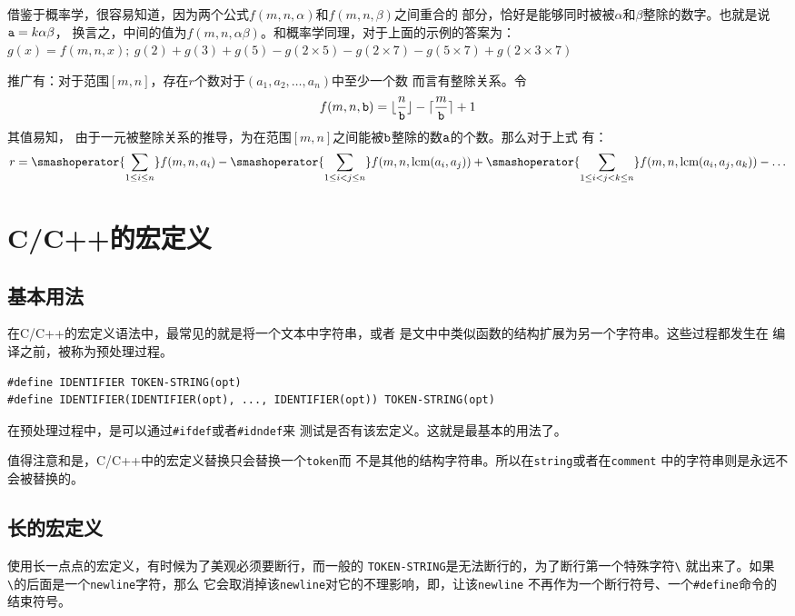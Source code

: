 借鉴于概率学，很容易知道，因为两个公式$f(m,n,\alpha)$和$f(m,n,\beta)$之间重合的
部分，恰好是能够同时被被$\alpha$和$\beta$整除的数字。也就是说$\text{\tt a}=k\alpha\beta$，
换言之，中间的值为$f(m,n,\alpha\beta)$。和概率学同理，对于上面的示例的答案为：%
$g(x)=f(m,n,x);\ g(2)+g(3)+g(5)-g(2\times5)-g(2\times7)-g(5\times7)+g(2\times3\times7)$

推广有：对于范围$[m,n]$，存在$r$个数对于$(a_1, a_2, \ldots, a_n)$中至少一个数
而言有整除关系。令$$f(m, n, \text{\tt b})=\lfloor{n\over\text{\tt b}}\rfloor-\lceil{m\over\text{\tt b}}\rceil + 1$$其值易知，
由于一元被整除关系的推导，为在范围$[m, n]$之间能被$\text{\tt b}$整除的数$\text{\tt a}$的个数。那么对于上式
有：$$r=\smashoperator{\sum_{1\le i\le n}}f(m,n,a_i)-
        \smashoperator{\sum_{1\le i<j\le n}}f(m,n,\lcm(a_i, a_j))+
        \smashoperator{\sum_{1\le i<j<k \le n}}f(m,n,\lcm(a_i, a_j, a_k))-\ldots$$


\def\Cp{C/C++}

\section{\Cp 的宏定义}

\subsection{基本用法}

在\Cp 的宏定义语法中，最常见的就是将一个文本中字符串，或者
是文中中类似函数的结构扩展为另一个字符串。这些过程都发生在
编译之前，被称为预处理过程。
\begin{lstlisting}
#define IDENTIFIER TOKEN-STRING(opt)
#define IDENTIFIER(IDENTIFIER(opt), ..., IDENTIFIER(opt)) TOKEN-STRING(opt)
\end{lstlisting}

在预处理过程中，是可以通过\verb|#ifdef|或者\verb|#idndef|来
测试是否有该宏定义。这就是最基本的用法了。

值得注意和是，\Cp 中的宏定义替换只会替换一个\verb|token|而
不是其他的结构字符串。所以在\verb|string|或者在\verb|comment|%
中的字符串则是永远不会被替换的。

\subsection{长的宏定义}

使用长一点点的宏定义，有时候为了美观必须要断行，而一般的%
\verb|TOKEN-STRING|是无法断行的，为了断行第一个特殊字符\verb|\|
就出来了。如果\verb|\|的后面是一个\verb|newline|字符，那么
它会取消掉该\verb|newline|对它的不理影响，即，让该\verb|newline|
不再作为一个断行符号、一个\verb|#define|命令的结束符号。

